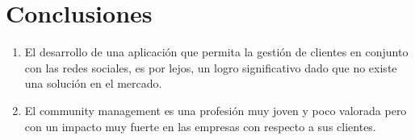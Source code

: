 \chapter*{Conclusiones}
\begin{enumerate}
\item El desarrollo de una aplicaci\'on que permita la gesti\'on de clientes en conjunto con las redes sociales, es por lejos, un logro significativo dado que no existe una soluci\'on en el mercado.
\item El community management es una profesi\'on muy joven y poco valorada pero con un impacto muy fuerte en las empresas con respecto a sus clientes.
\end{enumerate}